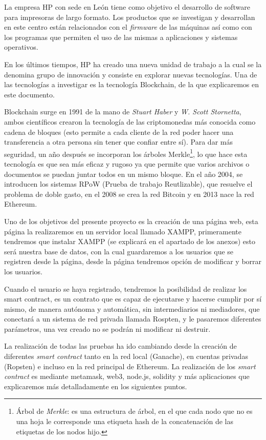 
La empresa HP con sede en León tiene como objetivo el desarrollo de software para impresoras de largo formato. Los productos que se investigan y desarrollan en este centro están relacionados con el \textit{firmware} de las máquinas así como con los programas que permiten el uso de las mismas a aplicaciones y sistemas operativos.

En los últimos tiempos, HP ha creado una nueva unidad de trabajo a la cual se la denomina grupo de innovación y consiste en explorar nuevas tecnologías. Una de las tecnologías a investigar es la tecnología Blockchain, de la que explicaremos en este documento. 

Blockchain\cite{informacionB} surge en 1991 de la mano de \textit{Stuart Haber} y \textit{W. Scott Stornetta}, ambos científicos crearon la tecnología de las criptomonedas más conocida como cadena de bloques (esto permite a cada cliente de la red poder hacer una transferencia a otra persona sin tener que confiar entre sí). Para dar más seguridad, un año después se incorporan los árboles Merkle\footnote{Árbol de \textit{Merkle}: es una estructura de árbol, en el que cada nodo que no es una hoja le corresponde una etiqueta hash de la concatenación de las etiquetas de los nodos hijo.}, lo que hace esta tecnología es que sea más eficaz y rugoso ya que permite que varios archivos o documentos se puedan juntar todos en un mismo bloque. En el año 2004, se introducen los sistemas RPoW (Prueba de trabajo Reutlizable), que resuelve el problema de doble gasto, en el 2008 se crea la red Bitcoin y en 2013 nace la red Ethereum.

Uno de los objetivos del presente proyecto es la creación de una página web, esta página la realizaremos en un servidor local llamado XAMPP, primeramente tendremos que instalar XAMPP (se explicará en el apartado de los anexos) esto será nuestra base de datos, con la cual guardaremos a los usuarios que se registren desde la página, desde la página tendremos opción de modificar y borrar los usuarios. 

Cuando el usuario se haya registrado, tendremos la posibilidad de realizar los smart contract, es un contrato que es capaz de ejecutarse y hacerse cumplir por sí mismo, de manera autónoma y automática, sin intermediarios ni mediadores, que conectará a un sistema de red privada llamada Rospten, y le pasaremos diferentes parámetros, una vez creado no se podrán ni modificar ni destruir. 

La realización de todas las pruebas ha ido cambiando desde la creación de diferentes \textit{smart contract} tanto en la red local (Ganache), en cuentas privadas (Ropsten) e incluso en la red principal de Ethereum. La realización de los \textit{smart contract} es mediante metamask, web3, node.js, solidity y más aplicaciones que explicaremos más detalladamente en los siguientes puntos.

